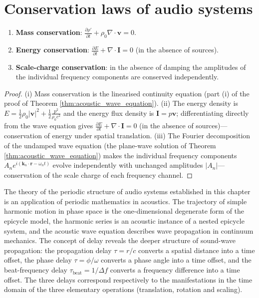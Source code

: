 \section{Conservation laws of audio systems}

\begin{theorem}\label{thm:acoustic_conservation}
\begin{enumerate}[label=(\roman*)]
    \item \textbf{Mass conservation}: $\frac{\partial \rho'}{\partial t} + \rho_0 \nabla \cdot \mathbf{v} = 0$.
    \item \textbf{Energy conservation}: $\frac{\partial E}{\partial t} + \nabla \cdot \mathbf{I} = 0$ (in the absence of sources).
    \item \textbf{Scale-charge conservation}: in the absence of damping the amplitudes of the individual frequency components are conserved independently.
\end{enumerate}
\end{theorem}

\begin{proof}
(i) Mass conservation is the linearised continuity equation (part (i) of the proof of Theorem \ref{thm:acoustic_wave_equation}). (ii) The energy density is $E = \frac{1}{2}\rho_0|\mathbf{v}|^2 + \frac{1}{2}\frac{p^2}{\rho_0 c^2}$ and the energy flux density is $\mathbf{I} = p\mathbf{v}$; differentiating directly from the wave equation gives $\frac{\partial E}{\partial t} + \nabla\cdot\mathbf{I} = 0$ (in the absence of sources)---conservation of energy under spatial translation. (iii) The Fourier decomposition of the undamped wave equation (the plane-wave solution of Theorem \ref{thm:acoustic_wave_equation}) makes the individual frequency components $A_n e^{i(\mathbf{k}_n\cdot\mathbf{r} - \omega_n t)}$ evolve independently with unchanged amplitudes $|A_n|$---conservation of the scale charge of each frequency channel.
\end{proof}

\begin{remark}
The theory of the periodic structure of audio systems established in this chapter is an application of periodic mathematics in acoustics. The trajectory of simple harmonic motion in phase space is the one-dimensional degenerate form of the epicycle model, the harmonic series is an acoustic instance of a nested epicycle system, and the acoustic wave equation describes wave propagation in continuum mechanics. The concept of delay reveals the deeper structure of sound-wave propagation: the propagation delay $\tau = r/c$ converts a spatial distance into a time offset, the phase delay $\tau = \phi/\omega$ converts a phase angle into a time offset, and the beat-frequency delay $\tau_{\text{beat}} = 1/\Delta f$ converts a frequency difference into a time offset. The three delays correspond respectively to the manifestations in the time domain of the three elementary operations (translation, rotation and scaling).
\end{remark}

